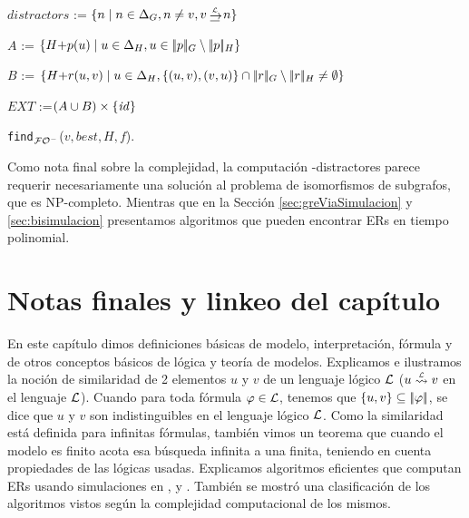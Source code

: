 \begin{megaalgorithm}[H] 
{} 

$\mathit{distractors}$ := $\cset{n \mid n \in \Delta_G, n \neq v , v \simul{\+L} n}$\;


 $A$ := $\{H {+} p(u) \mid u \in \Delta_H, u \in |\!|p|\!|_G  \setminus |\!|p|\!|_H\}$\;

 $B$ := $\{H {+} r(u,v) \mid u \in \Delta_H, \{(u,v),(v,u)\}\cap |\!|r|\!|_G \setminus |\!|r|\!|_H\not=\emptyset\}$\;

 $EXT$ :=$(A \cup B) \times \{\mathit{id}\}$\;
%
%
 
\;

\caption{\small \texttt{find}$_{\mathcal{FO}^-}$($v, \mathit{best},H,f$).}\label{alg:find}
\end{megaalgorithm}

Como nota final sobre la complejidad, la computaci\'on
\EPFOL-distractores parece requerir necesariamente una soluci\'on al problema de isomorfismos de subgrafos, que es NP-completo. Mientras que en la Secci\'on \ref{sec:greViaSimulacion} y \ref{sec:bisimulacion} presentamos algoritmos que pueden encontrar ERs en tiempo polinomial.


\section{Notas finales y linkeo del cap\'itulo}
\label{sec:notasFinales}

En este cap\'itulo dimos definiciones b\'asicas de modelo, interpretaci\'on, f\'ormula y de otros conceptos b\'asicos de l\'ogica y teor\'ia de modelos. Explicamos e ilustramos la noci\'on de similaridad de 2 elementos $u$ y $v$ de un lenguaje l\'ogico $\mathcal{L}$ ($u \simil{\+L} v$ en el lenguaje $\mathcal{L}$). Cuando para toda f\'ormula $\varphi \in \mathcal{L}$, tenemos que $\{u,v\} \subseteq |\!|\varphi|\!|$,  se dice que $u$ y $v$ son indistinguibles en el lenguaje l\'ogico $\mathcal{L}$. Como la similaridad est\'a definida para infinitas f\'ormulas, tambi\'en vimos un teorema que cuando el modelo es finito acota esa b\'usqueda
infinita a una finita, teniendo en cuenta propiedades de las l\'ogicas usadas. Explicamos algoritmos eficientes que computan ERs usando simulaciones en \EPFOL, \ALC y \EL. Tambi\'en se mostr\'o una clasificaci\'on de los algoritmos vistos seg\'un la complejidad computacional de los mismos. 

